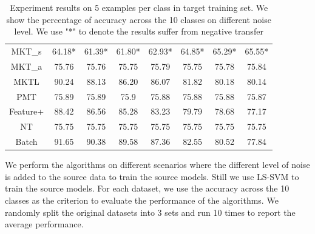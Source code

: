 \begin{table}[htbp]
{{\begin{tabular}{|c|c|c|c|c|c|c|c|}
           MKT\_{s} & 64.18* & 61.39* & 61.80* & 62.93* & 64.85* & 65.29* & 65.55*\\ 
           MKT\_{a} & 75.76 & 75.76 & 75.75 & 75.79 & 75.75 & 75.78 & 75.84\\ 
           MKTL & 90.24 & 88.13 & 86.20 & 86.07 & 81.82 & 80.18 & 80.14\\ 
           PMT & 75.89 & 75.89 & 75.9 & 75.88 & 75.88 & 75.88 & 75.87\\ 
           Feature+ & 88.42 & 86.56 & 85.28 & 83.23 & 79.79 & 78.68 & 77.17\\ 
           NT & 75.75 & 75.75 & 75.75 & 75.75 & 75.75 & 75.75 & 75.75\\ 
           Batch & 91.65 & 90.38 & 89.58 & 87.36 & 82.55 & 80.52 & 77.84\\ 
     \hline\end{tabular}}}%
     \caption{Experiment results on 5 examples per class in target training set. We show the percentage of accuracy across the 10 classes on different noise level. We use "*" to denote the results suffer from negative transfer}\label{tab:rs}
  \end{table}%
  
We perform the algorithms on different scenarios where the different level of noise is added to the source data to train the source models. Still we use LS-SVM to train the source models. For each dataset, we use the accuracy across the 10 classes as the criterion to evaluate the performance of the algorithms. We randomly split the original datasets into 3 sets and run 10 times to report the average performance. 

